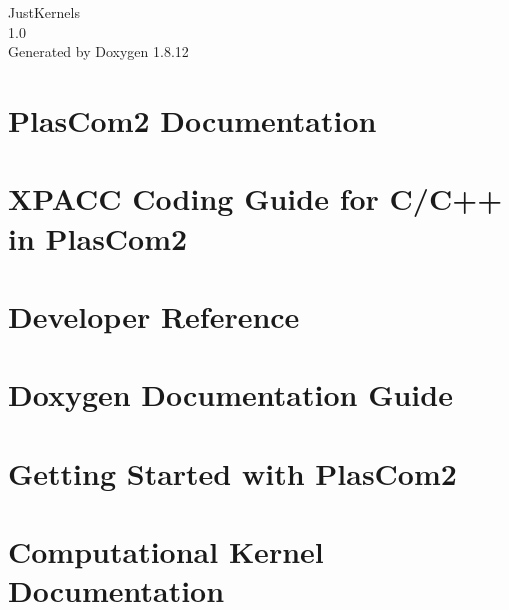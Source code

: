 \documentclass[twoside]{book}
\newcommand{\+}{\discretionary{\mbox{\scriptsize$\hookleftarrow$}}{}{}}
\newcommand{\clearemptydoublepage}{%
  \newpage{\pagestyle{empty}\cleardoublepage}%
}
\begin{document}
\hypersetup{pageanchor=false,
             bookmarksnumbered=true,
             pdfencoding=unicode
            }
\begin{titlepage}
\vspace*{7cm}
\begin{center}%
{\Large Just\+Kernels \\[1ex]\large 1.\+0 }\\
\vspace*{1cm}
{\large Generated by Doxygen 1.8.12}\\
\end{center}
\end{titlepage}
\clearemptydoublepage
{}
\tableofcontents
\clearemptydoublepage
{}
\hypersetup{pageanchor=true}

\chapter{Plas\+Com2 Documentation}
\label{index}\hypertarget{index}{}
\chapter{X\+P\+A\+CC Coding Guide for C/\+C++ in Plas\+Com2}
\label{xpacc_coding_guide}
\hypertarget{xpacc_coding_guide}{}

\chapter{Developer Reference}
\label{developer_reference}
\hypertarget{developer_reference}{}

\chapter{Doxygen Documentation Guide}
\label{xpacc_documentation_guide}
\hypertarget{xpacc_documentation_guide}{}

\chapter{Getting Started with Plas\+Com2}
\label{getting_started}
\hypertarget{getting_started}{}

\chapter{Computational Kernel Documentation}
\label{kernel_documentation}
\hypertarget{kernel_documentation}{}

\end{document}
